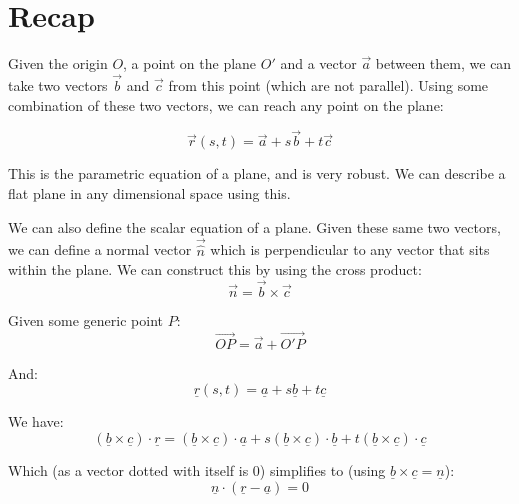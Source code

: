 
\section*{Recap}
Given the origin $O$, a point on the plane $O'$ and a vector $\vec{a}$ between them, we can take two vectors $\vec{b}$ and $\vec{c}$ from this point (which are not parallel). Using some combination of these two vectors, we can reach any point on the plane:

\[
    \vec{r}(s, t) = \vec{a} + s \vec{b} + t \vec{c} 
\]

This is the parametric equation of a plane, and is very robust. We can describe a flat plane in any dimensional space using this.

We can also define the scalar equation of a plane. Given these same two vectors, we can define a normal vector $\vec{\hat{n}}$ which is perpendicular to any vector that sits within the plane. We can construct this by using the cross product:
\[
    \vec{n} = \vec{b} \times \vec{c}
\]

Given some generic point $P$:
\[
    \vec{OP} = \vec{a} + \vec{O'P}
\]

And:
\[
    \underline{r}(s, t) = \underline{a} + s \underline{b} + t \underline{c}
\]

We have:
\[
    (\underline{b} \times \underline{c}) \cdot \underline{r} = (\underline{b} \times \underline{c}) \cdot \underline{a} + s(\underline{b} \times \underline{c})\cdot \underline{b} + t(\underline{b} \times \underline{c}) \cdot \underline{c}
\]

Which (as a vector dotted with itself is 0) simplifies to (using $\underline{b} \times \underline{c} = \underline{n}
$):
\[
    \underline{n} \cdot (\underline{r} - \underline{a}) = 0
\]
